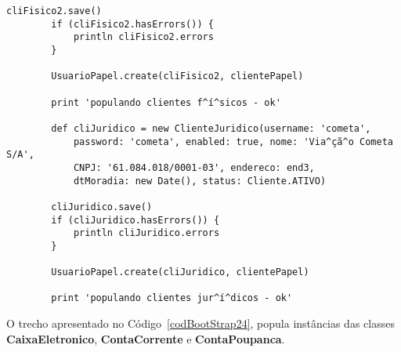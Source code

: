 \begin{lstlisting}[caption={\bf BootStrap.groovy (3)}, frame = trBL, float=htbp,
    label=codBootStrap23]
        cliFisico2.save()
        if (cliFisico2.hasErrors()) {
            println cliFisico2.errors
        }

        UsuarioPapel.create(cliFisico2, clientePapel)
        
        print 'populando clientes f^í^sicos - ok'

        def cliJuridico = new ClienteJuridico(username: 'cometa', 
            password: 'cometa', enabled: true, nome: 'Via^çã^o Cometa S/A', 
            CNPJ: '61.084.018/0001-03', endereco: end3,
            dtMoradia: new Date(), status: Cliente.ATIVO)         

        cliJuridico.save()
        if (cliJuridico.hasErrors()) {
            println cliJuridico.errors
        }   

        UsuarioPapel.create(cliJuridico, clientePapel)
     
        print 'populando clientes jur^í^dicos - ok'
\end{lstlisting}

\newpage

O  trecho  apresentado  no  Código~\ref{codBootStrap24},  popula  instâncias  das
classes {\bf CaixaEletronico}, {\bf ContaCorrente} e {\bf ContaPoupanca}. 

